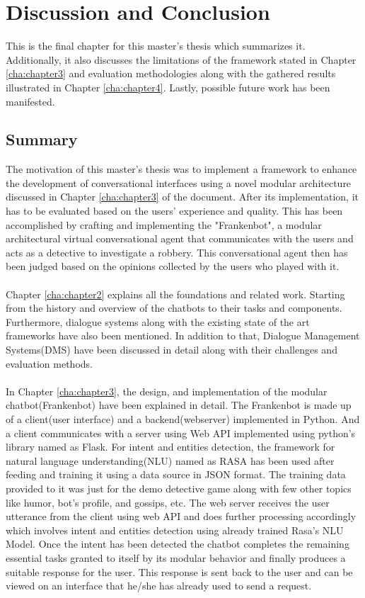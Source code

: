 \chapter{Discussion and Conclusion\label{cha:chapter5}}
This is the final chapter for this master's thesis which summarizes it. Additionally, it also discusses the limitations of the framework stated in Chapter \ref{cha:chapter3} and evaluation methodologies along with the gathered results illustrated in Chapter \ref{cha:chapter4}. Lastly, possible future work has been manifested.

\section{Summary}
The motivation of this master's thesis was to implement a framework to enhance the development of conversational interfaces using a novel modular architecture discussed in Chapter \ref{cha:chapter3} of the document. After its implementation, it has to be evaluated based on the users' experience and quality. This has been accomplished by crafting and implementing the "Frankenbot", a modular architectural virtual conversational agent that communicates with the users and acts as a detective to investigate a robbery. This conversational agent then has been judged based on the opinions collected by the users who played with it.
\\~\\
Chapter \ref{cha:chapter2} explains all the foundations and related work. Starting from the history and overview of the chatbots to their tasks and components. Furthermore, dialogue systems along with the existing state of the art frameworks have also been mentioned. In addition to that, Dialogue Management Systems(DMS) have been discussed in detail along with their challenges and evaluation methods.
\\~\\
In Chapter \ref{cha:chapter3}, the design, and implementation of the modular chatbot(Frankenbot) have been explained in detail. The Frankenbot is made up of a client(user interface) and a backend(webserver) implemented in Python. And a client communicates with a server using Web API implemented using python's library named as Flask. For intent and entities detection, the framework for natural language understanding(NLU) named as RASA has been used after feeding and training it using a data source in JSON format. The training data provided to it was just for the demo detective game along with few other topics like humor, bot's profile, and gossips, etc. The web server receives the user utterance from the client using web API and does further processing accordingly which involves intent and entities detection using already trained Rasa's NLU Model. Once the intent has been detected the chatbot completes the remaining essential tasks granted to itself by its modular behavior and finally produces a suitable response for the user. This response is sent back to the user and can be viewed on an interface that he/she has already used to send a request.
